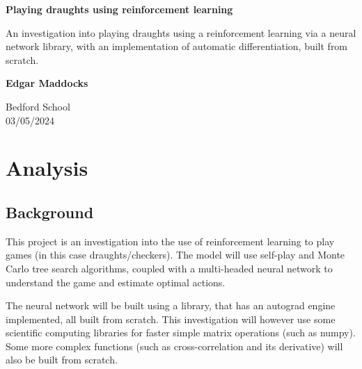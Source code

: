 \documentclass{article}
\begin{document}
\begin{titlepage}
    \begin{center}
        \vspace*{1cm}
            
        \Huge
        \textbf{Playing draughts using reinforcement learning}
            
        \vspace{0.5cm}
        \LARGE
        An investigation into playing draughts using a reinforcement learning via a neural network library, with an implementation of
        automatic differentiation, built from scratch.
            
        \vspace{1.5cm}
            
        \textbf{Edgar Maddocks}            
        \vfill
            
        \vspace{0.8cm}
                        
        \Large
        Bedford School\\
        03/05/2024\\
            
    \end{center}
\end{titlepage}

    \pagebreak

    \tableofcontents

    \section{Analysis}
    \subsection{Background}
    This project is an investigation into the use of reinforcement learning to play games (in this case draughts/checkers).
    The model will use self-play and Monte Carlo tree search algorithms, coupled with a multi-headed neural network to
    understand the game and estimate optimal actions.

    The neural network will be built using a library, that has an autograd engine implemented, all built from scratch. This
    investigation will however use some scientific computing libraries for faster simple matrix operations (such as numpy). Some more
    complex functions (such as cross-correlation and its derivative) will also be built from scratch.
\end{document}
